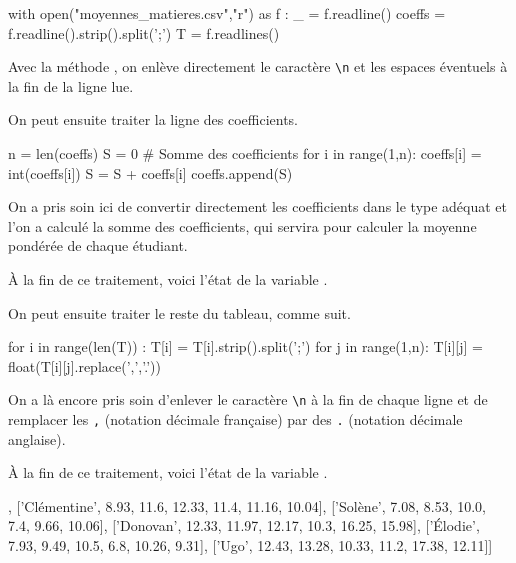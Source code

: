 \begin{pyverbatim}
with open("moyennes_matieres.csv","r") as f : 
    _ = f.readline()
    coeffs = f.readline().strip().split(';')
    T = f.readlines()
\end{pyverbatim}
\begin{rem}
    Avec la méthode , on enlève directement le caractère \texttt{\textbackslash n} et les espaces éventuels à la fin de la ligne lue. 
\end{rem}

On peut ensuite traiter la ligne des coefficients. 
\begin{pyverbatim}
n = len(coeffs)
S = 0 # Somme des coefficients
for i in range(1,n):
    coeffs[i] = int(coeffs[i])
    S = S + coeffs[i]
coeffs.append(S)
\end{pyverbatim}
\begin{rem}
    On a pris soin ici de convertir directement les coefficients dans le type adéquat et l'on a calculé la somme des coefficients, qui servira pour calculer la moyenne pondérée de chaque étudiant. 
\end{rem}
À la fin de ce traitement, voici l'état de la variable .
\begin{pyverbatim}
['Coefficient', 8, 7, 4, 3, 2, 2, 26]
\end{pyverbatim}

On peut ensuite traiter le reste du tableau, comme suit. 
\begin{pyverbatim}
for i in range(len(T)) :
    T[i] = T[i].strip().split(';')
    for j in range(1,n):
        T[i][j] = float(T[i][j].replace(',','.'))
\end{pyverbatim}
\begin{rem}
    On a là encore pris soin d'enlever le caractère \texttt{\textbackslash n} à la fin de chaque ligne et de remplacer les \texttt{,} (notation décimale française) par des \texttt{.} (notation décimale anglaise). 
\end{rem}
À la fin de ce traitement, voici l'état de la variable .
\begin{pyverbatim}
[['Laura', 8.15, 9.84, 11.0, 5.5, 10.64, 7.16], 
 ['Clémentine', 8.93, 11.6, 12.33, 11.4, 11.16, 10.04], 
 ['Solène', 7.08, 8.53, 10.0, 7.4, 9.66, 10.06], 
 ['Donovan', 12.33, 11.97, 12.17, 10.3, 16.25, 15.98], 
 ['Élodie', 7.93, 9.49, 10.5, 6.8, 10.26, 9.31], 
 ['Ugo', 12.43, 13.28, 10.33, 11.2, 17.38, 12.11]]
\end{pyverbatim}

